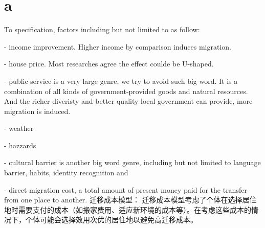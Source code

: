 \documentclass[a4paper,12pt,oneside, fontset=mac]{ctexbook} %
\begin{document}
\chapter{a}


To specification, factors including but not limited to as follow:

- income improvement. Higher income by comparison induces migration. 

- house price. Most researches agree the effect coulde be U-shaped.

- public service is a very large genre, we try to avoid such big word. It is a combination of all kinds of government-provided goods and natural resources. And the richer diveristy and better quality local government can provide, more migration is induced.

- weather

- hazzards

- cultural barrier is another big word genre, including but not limited to language barrier, habits, identity recognition and 

- direct migration cost, a total amount of present money paid for the transfer from one place to another. 迁移成本模型： 迁移成本模型考虑了个体在选择居住地时需要支付的成本（如搬家费用、适应新环境的成本等）。在考虑这些成本的情况下，个体可能会选择效用次优的居住地以避免高迁移成本。


\newpage


% 
\end{document}
